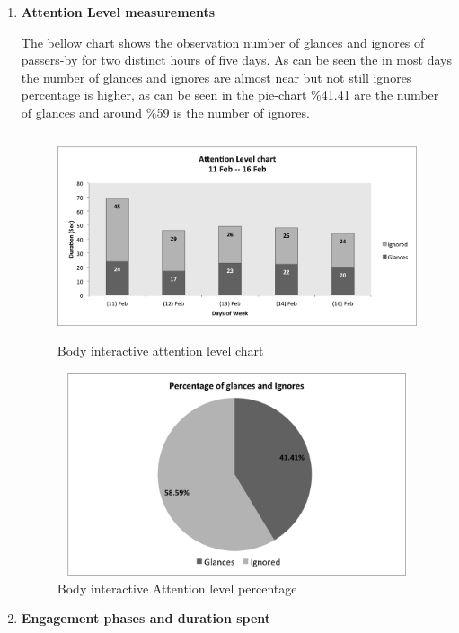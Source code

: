 \begin{enumerate}
\item \textbf{Attention Level measurements}

The bellow chart shows the observation number of glances and ignores of passers-by for two distinct hours of five days. As can be seen the in most days the number of glances and ignores are almost near but not still ignores percentage is higher, as can be seen in the pie-chart \%41.41 are the number of glances and around \%59 is the number of ignores. 
\begin{figure}[H]
    \centering
    \includegraphics[width=110mm,height=60mm]{Figures/8/body_inter_findings/Body_Inter_chart}%
    \caption{Body interactive attention level chart}%
    \label{fig:bodyattentionlevelchart}%
\end{figure}


\begin{figure}[H]
    \centering
    \includegraphics[width=110mm,height=60mm]{Figures/8/body_inter_findings/body_inter_percentage}
    \caption{Body interactive Attention level percentage}%
    \label{fig:bodyattentionlevelpercentage}%
\end{figure}



\item \textbf{Engagement phases and duration spent}


\end{enumerate}
